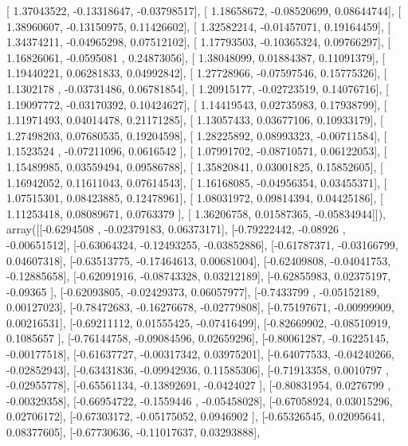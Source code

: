\documentclass{article}
\begin{document}
       [ 1.37043522, -0.13318647, -0.03798517],
       [ 1.18658672, -0.08520699,  0.08644744],
       [ 1.38960607, -0.13150975,  0.11426602],
       [ 1.32582214, -0.01457071,  0.19164459],
       [ 1.34374211, -0.04965298,  0.07512102],
       [ 1.17793503, -0.10365324,  0.09766297],
       [ 1.16826061, -0.0595081 ,  0.24873056],
       [ 1.38048099,  0.01884387,  0.11091379],
       [ 1.19440221,  0.06281833,  0.04992842],
       [ 1.27728966, -0.07597546,  0.15775326],
       [ 1.1302178 , -0.03731486,  0.06781854],
       [ 1.20915177, -0.02723519,  0.14076716],
       [ 1.19097772, -0.03170392,  0.10424627],
       [ 1.14419543,  0.02735983,  0.17938799],
       [ 1.11971493,  0.04014478,  0.21171285],
       [ 1.13057433,  0.03677106,  0.10933179],
       [ 1.27498203,  0.07680535,  0.19204598],
       [ 1.28225892,  0.08993323, -0.00711584],
       [ 1.1523524 , -0.07211096,  0.0616542 ],
       [ 1.07991702, -0.08710571,  0.06122053],
       [ 1.15489985,  0.03559494,  0.09586788],
       [ 1.35820841,  0.03001825,  0.15852605],
       [ 1.16942052,  0.11611043,  0.07614543],
       [ 1.16168085, -0.04956354,  0.03455371],
       [ 1.07515301,  0.08423885,  0.12478961],
       [ 1.08031972,  0.09814394,  0.04425186],
       [ 1.11253418,  0.08089671,  0.0763379 ],
       [ 1.36206758,  0.01587365, -0.05834944]]), array([[-0.6294508 , -0.02379183,  0.06373171],
       [-0.79222442, -0.08926   , -0.00651512],
       [-0.63064324, -0.12493255, -0.03852886],
       [-0.61787371, -0.03166799,  0.04607318],
       [-0.63513775, -0.17464613,  0.00681004],
       [-0.62409808, -0.04041753, -0.12885658],
       [-0.62091916, -0.08743328,  0.03212189],
       [-0.62855983,  0.02375197, -0.09365   ],
       [-0.62093805, -0.02429373,  0.06057977],
       [-0.7433799 , -0.05152189,  0.00127023],
       [-0.78472683, -0.16276678, -0.02779808],
       [-0.75197671, -0.00999909,  0.00216531],
       [-0.69211112,  0.01555425, -0.07416499],
       [-0.82669902, -0.08510919,  0.1085657 ],
       [-0.76144758, -0.09084596,  0.02659296],
       [-0.80061287, -0.16225145, -0.00177518],
       [-0.61637727, -0.00317342,  0.03975201],
       [-0.64077533, -0.04240266, -0.02852943],
       [-0.63431836, -0.09942936,  0.11585306],
       [-0.71913358,  0.0010797 , -0.02955778],
       [-0.65561134, -0.13892691, -0.0424027 ],
       [-0.80831954,  0.0276799 , -0.00329358],
       [-0.66954722, -0.1559446 , -0.05458028],
       [-0.67058924,  0.03015296,  0.02706172],
       [-0.67303172, -0.05175052,  0.0946902 ],
       [-0.65326545,  0.02095641,  0.08377605],
       [-0.67730636, -0.11017637,  0.03293888],
\end{document}
